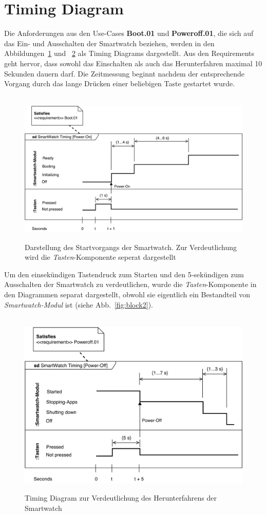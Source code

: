 \section{Timing Diagram}
Die Anforderungen aus den \glspl{Use-Case} \textbf{Boot.01} und \textbf{Poweroff.01}, die sich auf das Ein- und Ausschalten der Smartwatch beziehen, werden in den Abbildungen~\ref{fig:timing_diagram_power_on} und ~\ref{fig:timing_diagram_power_off} als Timing Diagrams dargestellt. Aus den \glspl{Requirement} geht hervor, dass sowohl das Einschalten als auch das Herunterfahren maximal 10 Sekunden dauern darf. Die Zeitmessung beginnt nachdem der entsprechende Vorgang durch das lange Drücken einer beliebigen Taste gestartet wurde.

\begin{figure}[h]
\centering\
\includegraphics[width=14cm]{img/timing_diagram_power_on}
\caption[Timing Diagram: Power-On]{Darstellung des Startvorgangs der Smartwatch. Zur Verdeutlichung wird die \textit{Tasten}-Komponente seperat dargestellt}
\label{fig:timing_diagram_power_on}
\end{figure}

Um den einsekündigen Tastendruck zum Starten und den 5-sekündigen zum Ausschalten der Smartwatch zu verdeutlichen, wurde die \textit{Tasten}-Komponente in den Diagrammen separat dargestellt, obwohl sie eigentlich ein Bestandteil von \textit{Smartwatch-Modul} ist (siehe Abb.~\ref{fig:block2}).

\begin{figure}[h]
\centering\
\includegraphics[width=14cm]{img/timing_diagram_power_off}
\caption[Timing Diagram: Power-Off]{Timing Diagram zur Verdeutlichung des Herunterfahrens der Smartwatch}
\label{fig:timing_diagram_power_off}
\end{figure}
